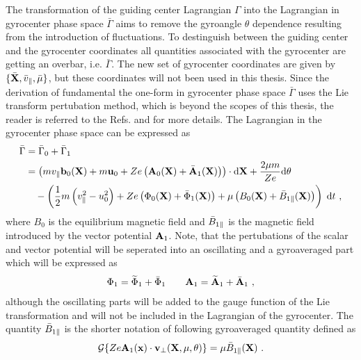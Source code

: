 The transformation of the guiding center Lagrangian $\Gamma$ into the Lagrangian in gyrocenter phase space $\bar{\Gamma}$ aims to remove the gyroangle $\theta$ dependence resulting from the introduction of fluctuations. To destinguish between the guiding center and the gyrocenter coordinates all quantities associated with the gyrocenter are getting an overbar, i.e. $\bar{\Gamma}$.  The new set of gyrocenter coordinates are given by $\{\bar{\boldsymbol{\mathbf{X}}}, \bar{v}_\parallel, \bar{\mu}\}$, but these coordinates will not been used in this thesis. Since the derivation of fundamental the one-form in gyrocenter phase space $\bar{\Gamma}$ uses the Lie transform pertubation method, which is beyond the scopes of this thesis, the reader is referred to the Refs.  and  for more details. The Lagrangian in the gyrocenter phase space can be expressed as
\begin{gather}
    \begin{aligned}
        \bar{\Gamma} &= \bar{\Gamma}_0 + \bar{\Gamma}_1 \\
                     &= \left(mv_\parallel \boldsymbol{\mathbf{b}}_0(\boldsymbol{\mathbf{X}}) + m\boldsymbol{\mathbf{u}}_0 + Ze\left(\boldsymbol{\mathbf{A}}_0(\boldsymbol{\mathbf{X}}) + \bar{\boldsymbol{\mathbf{A}}}_1(\boldsymbol{\mathbf{X}})\right)\right) \cdot \mathrm{d}\boldsymbol{\mathbf{X}} + \frac{2\mu m}{Ze} \mathrm{d}\theta \\
                     &\quad - \left(\frac{1}{2} m \left(v_\parallel^2 - u_0^2 \right) + Ze \left(\Phi_0(\boldsymbol{\mathbf{X}}) + \bar{\Phi}_1(\boldsymbol{\mathbf{X}})\right) + \mu\left(B_0(\boldsymbol{\mathbf{X}}) + \bar{B}_{1\parallel}(\boldsymbol{\mathbf{X}})\right)\right)\;\mathrm{d}t~,
    \end{aligned}
    \label{eq:gyrocenterPertrubationLagrangian}
\end{gather}
where $B_0$ is the equilibrium magnetic field and $\bar{B}_{1\parallel}$ is the magnetic field introduced by the vector potential $\boldsymbol{\mathbf{A}}_1$. Note, that the pertubations of the scalar and vector potential will be seperated into an oscillating and a gyroaveraged part which will be expressed as
\begin{gather}
    \Phi_1 = \widetilde{\Phi}_1 + \bar{\Phi}_1  \qquad \boldsymbol{\mathbf{A}}_1 = \widetilde{\boldsymbol{\mathbf{A}}}_1 + \bar{\boldsymbol{\mathbf{A}}}_1 ~,
    \label{eq:electromagneticPertubationSeperated}
\end{gather}
although the oscillating parts will be added to the gauge function of the Lie transformation and will not be included in the Lagrangian of the gyrocenter. The quantity $\bar{B}_{1\parallel}$ is the shorter notation of following gyroaveraged quantity defined as
\begin{gather}
    \mathcal{G} \{Ze \boldsymbol{\mathbf{A}}_1(\boldsymbol{\mathbf{x}}) \cdot \boldsymbol{\mathbf{v}}_\perp (\boldsymbol{\mathbf{X}},\mu,\theta)\} = \mu\bar{B}_{1\parallel}(\boldsymbol{\mathbf{X}})~. 
    \label{eq:gyrocenterGyroaveragedMagnetic}
\end{gather}